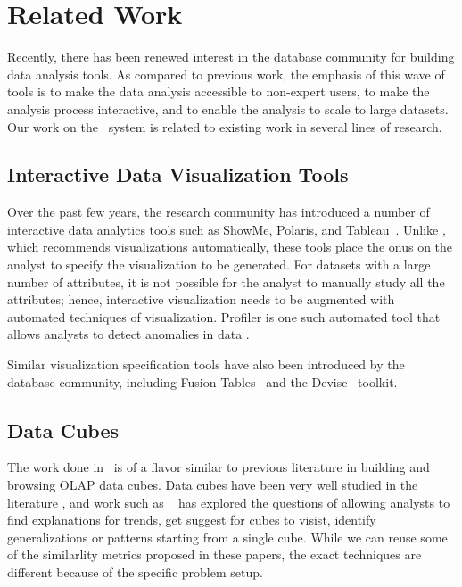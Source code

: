\chapter{Related Work}
\label{sec:related_work}

Recently, there has been renewed interest in the database community for building
data analysis tools. As compared to previous work, the emphasis of this wave of
tools is to make the data analysis accessible to non-expert users, to make the
analysis process interactive, and to enable the analysis to scale to large
datasets. Our work on the \SeeDB\ system is related to existing work in several
lines of research.

\section{Interactive Data Visualization Tools}
Over the past few years, the research community has introduced a number of
interactive data analytics tools such as ShowMe, Polaris, and 
Tableau~\cite{DBLP:journals/cacm/StolteTH08, DBLP:journals/tvcg/MackinlayHS07}.
Unlike \SeeDB, which recommends visualizations automatically, these tools place
the onus on the analyst to specify the visualization to be generated.
For datasets with a large number of attributes, it is not possible
for the analyst to manually study all the attributes; hence, interactive
visualization needs to be augmented with automated techniques of visualization.
Profiler is one such automated tool that allows analysts to detect anomalies in
data \cite{DBLP:conf/AVI/KandelPPHH12}.

Similar visualization specification tools have also been introduced by the
database community, including Fusion
Tables~\cite{DBLP:conf/sigmod/GonzalezHJLMSSG10} and the
Devise~\cite{DBLP:conf/sigmod/LivnyRBCDLMW97} toolkit.

\section{Data Cubes}
The work done in \SeeDB\ is of a flavor similar to previous literature in
building and browsing OLAP data cubes. Data cubes have been very well studied in
the literature \cite{DBLP:conf/SIGMOD/HarinarayanRU96,
DBLP:jounral/DMKD/GrayCBLR97}, and work such as
~\cite{DBLP:conf/vldb/Sarawagi99, DBLP:conf/vldb/SatheS01,
DBLP:conf/vldb/Sarawagi00, DBLP:conf/SIGKDD/OrdonezC09} has explored the
questions of allowing analysts to find explanations for trends, get suggest for
cubes to visist, identify generalizations or patterns starting from a single
cube. While we can reuse some of the similarlity metrics proposed in these
papers, the exact techniques are different because of the specific problem
setup.

